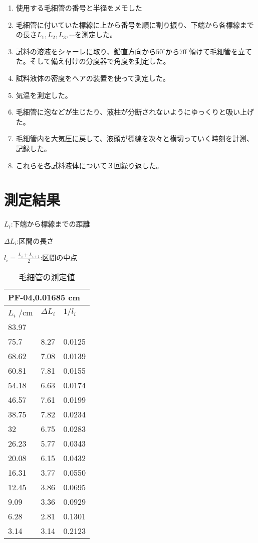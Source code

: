 \documentclass{jsarticle}
\begin{document}
\begin{enumerate}
\item 使用する毛細管の番号と半径をメモした
\item 毛細管に付いていた標線に上から番号を順に割り振り、下端から各標線までの長さ$L_1,L_2,L_3,\cdots$を測定した。
\item 試料の溶液をシャーレに取り、鉛直方向から$50^\circ から 70^\circ$傾けて毛細管を立てた。そして備え付けの分度器で角度を測定した。
\item 試料液体の密度をヘアの装置を使って測定した。
\item 気温を測定した。
\item 毛細管に泡などが生じたり、液柱が分断されないようにゆっくりと吸い上げた。
\item 毛細管内を大気圧に戻して、液頭が標線を次々と横切っていく時刻を計測、記録した。
\item これらを各試料液体について３回繰り返した。
\end{enumerate}

\section{測定結果}
\begin{center}
\par $L_i$:下端から標線までの距離
\par $\Delta L_i$:区間の長さ
\par $l_i = \frac{L_i + L_{i+1}}{2}$:区間の中点
\end{center}

\begin{table}[H]
\centering
\caption{毛細管の測定値}
\label{my-label}
\begin{tabular}{|l|l|l|}
\hline
\multicolumn{3}{|l|}{PF-04,0.01685 cm} \\ \hline
$L_i$ /cm   & $\Delta L_i$   & $1/l_i$    \\ \hline
83.97    &            &         \\ \hline
75.7     & 8.27       & 0.0125  \\ \hline
68.62    & 7.08       & 0.0139  \\ \hline
60.81    & 7.81       & 0.0155  \\ \hline
54.18    & 6.63       & 0.0174  \\ \hline
46.57    & 7.61       & 0.0199  \\ \hline
38.75    & 7.82       & 0.0234  \\ \hline
32       & 6.75       & 0.0283  \\ \hline
26.23    & 5.77       & 0.0343  \\ \hline
20.08    & 6.15       & 0.0432  \\ \hline
16.31    & 3.77       & 0.0550  \\ \hline
12.45    & 3.86       & 0.0695  \\ \hline
9.09     & 3.36       & 0.0929  \\ \hline
6.28     & 2.81       & 0.1301  \\ \hline
3.14     & 3.14       & 0.2123  \\ \hline
\end{tabular}
\end{table}
\end{document}
